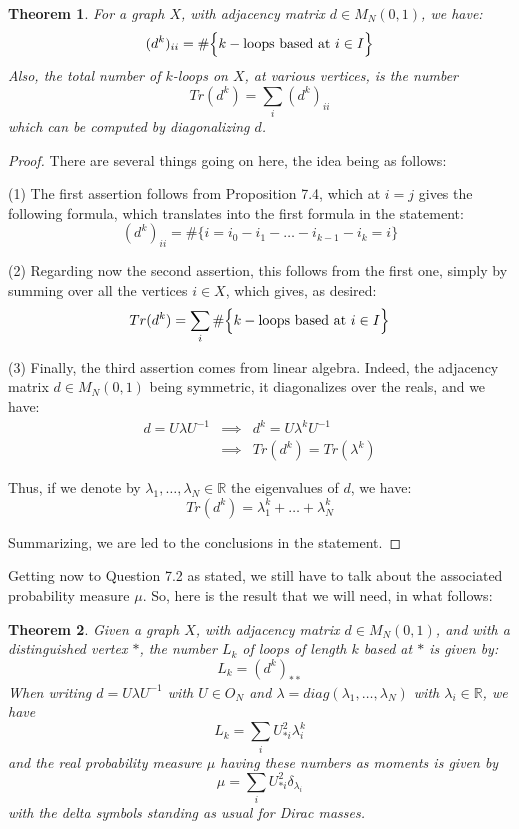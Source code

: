 \documentclass[12pt]{amsbook}
\newtheorem{theorem}{Theorem}[chapter]
\begin{document}

\begin{theorem}
For a graph $X$, with adjacency matrix $d\in M_N(0,1)$, we have:
$$(d^k)_{ii}=\#\Big\{k-{\rm loops\ based\ at\ }i\in I\Big\}$$
Also, the total number of $k$-loops on $X$, at various vertices, is the number
$$Tr(d^k)=\sum_i(d^k)_{ii}$$
which can be computed by diagonalizing $d$.
\end{theorem}

\begin{proof}
There are several things going on here, the idea being as follows:

\medskip

(1) The first assertion follows from Proposition 7.4, which at $i=j$ gives the following formula, which translates into the first formula in the statement:
$$(d^k)_{ii}=\#\Big\{i=i_0-i_1-\ldots-i_{k-1}-i_k=i\Big\}$$

(2) Regarding now the second assertion, this follows from the first one, simply by summing over all the vertices $i\in X$, which gives, as desired:
$$Tr(d^k)=\sum_i\#\Big\{k-{\rm loops\ based\ at\ }i\in I\Big\}$$

(3) Finally, the third assertion comes from linear algebra. Indeed, the adjacency matrix $d\in M_N(0,1)$ being symmetric, it diagonalizes over the reals, and we have:
\begin{eqnarray*}
d=U\lambda U^{-1}
&\implies&d^k=U\lambda ^kU^{-1}\\
&\implies&Tr(d^k)=Tr(\lambda ^k)
\end{eqnarray*}

Thus, if we denote by $\lambda_1,\ldots,\lambda_N\in\mathbb R$ the eigenvalues of $d$, we have:
$$Tr(d^k)=\lambda_1^k+\ldots+\lambda_N^k$$

Summarizing, we are led to the conclusions in the statement.
\end{proof}

Getting now to Question 7.2 as stated, we still have to talk about the associated probability measure $\mu$. So, here is the result that we will need, in what follows:


\begin{theorem}
Given a graph $X$, with adjacency matrix $d\in M_N(0,1)$, and with a distinguished vertex $*$, the number $L_k$ of loops of length $k$ based at $*$ is given by:
$$L_k=(d^k)_{**}$$
When writing $d=U\lambda U^{-1}$ with $U\in O_N$ and $\lambda=diag(\lambda_1,\ldots,\lambda_N)$ with $\lambda_i\in\mathbb R$, we have
$$L_k=\sum_iU_{*i}^2\lambda_i^k$$
and the real probability measure $\mu$ having these numbers as moments is given by
$$\mu=\sum_iU_{*i}^2\delta_{\lambda_i}$$
with the delta symbols standing as usual for Dirac masses.
\end{theorem}
\end{document}
